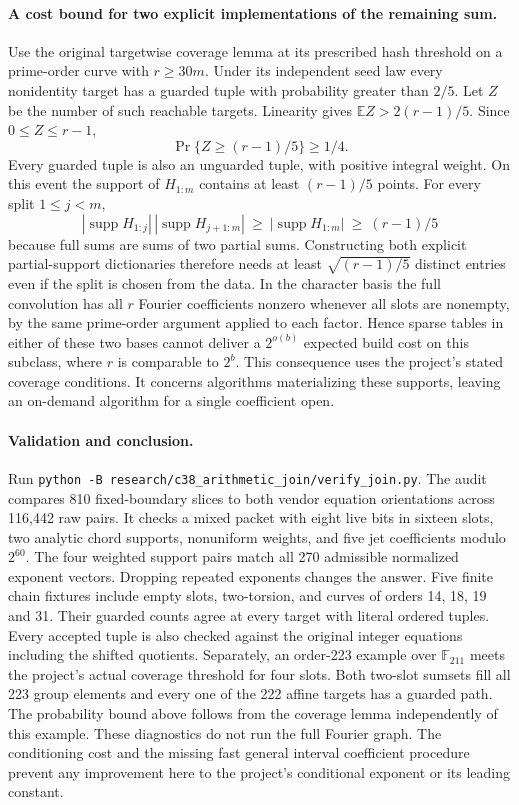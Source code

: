 \documentclass[11pt]{article}
\begin{document}
\paragraph{A cost bound for two explicit implementations of the remaining sum.}
Use the original targetwise coverage lemma at its prescribed hash
threshold on a prime-order curve with $r\ge30m$. Under its independent
seed law every nonidentity target has a guarded tuple with probability
greater than $2/5$. Let $Z$ be the number of such reachable targets.
Linearity gives $\mathbb E Z>2(r-1)/5$. Since $0\le Z\le r-1$,
\[
 \Pr\{Z\ge(r-1)/5\}\ge 1/4.
\]
Every guarded tuple is also an unguarded tuple, with positive integral
weight. On this event the support of $H_{1:m}$ contains at least
$(r-1)/5$ points. For every split $1\le j<m$,
\[
 |\operatorname{supp}H_{1:j}|\,|\operatorname{supp}H_{j+1:m}|
 \ \ge\ |\operatorname{supp}H_{1:m}|\ \ge\ (r-1)/5
\]
because full sums are sums of two partial sums. Constructing both
explicit partial-support dictionaries therefore needs at least
$\sqrt{(r-1)/5}$ distinct entries even if the split is chosen from the
data. In the character basis the full convolution has all $r$ Fourier
coefficients nonzero whenever all slots are nonempty, by the same
prime-order argument applied to each factor. Hence sparse tables in
either of these two bases cannot deliver a $2^{o(b)}$ expected build
cost on this subclass, where $r$ is comparable to $2^b$. This
consequence uses the project's stated coverage conditions. It concerns
algorithms materializing these supports, leaving an on-demand algorithm
for a single coefficient open.

\paragraph{Validation and conclusion.}
Run \texttt{python -B research/c38\_arithmetic\_join/verify\_join.py}.
The audit compares 810 fixed-boundary slices to both vendor equation
orientations across 116,442 raw pairs. It checks a mixed packet with eight
live bits in sixteen slots, two analytic chord supports, nonuniform weights,
and five jet coefficients modulo $2^{60}$. The four weighted support
pairs match all 270 admissible normalized exponent vectors. Dropping
repeated exponents changes the answer. Five finite chain fixtures include
empty slots, two-torsion, and curves of orders 14, 18, 19 and 31. Their
guarded counts agree at every target with literal ordered tuples. Every
accepted tuple is also checked against the original integer equations
including the shifted quotients. Separately, an order-223 example over
$\mathbb F_{211}$ meets the project's actual coverage threshold for four
slots. Both two-slot sumsets fill all 223 group elements and every one
of the 222 affine targets has a guarded path. The probability bound
above follows from the coverage lemma independently of this example.
These diagnostics do not run the full Fourier graph.
The conditioning cost and the missing fast general interval coefficient
procedure prevent any improvement here to the project's conditional
exponent or its leading constant.
\end{document}

